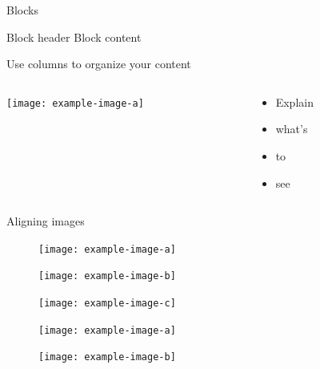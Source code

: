 \documentclass[ignorenonframetext,aspectratio=169]{beamer}
\begin{document}
\begin{frame}{Blocks}
\begin{block}{Block header}
Block content
\end{block}
\end{frame}

\begin{frame}{Use columns to organize your content}

\begin{columns}[T]
\begin{column}{0.55\textwidth}
\texttt{[image: example-image-a]}
\end{column}

\begin{column}{0.45\textwidth}
\begin{itemize}[<+->]
\item Explain
\item what's
\item to
\item see
\end{itemize}
\end{column}
\end{columns}

\end{frame}

\begin{frame}{Aligning images}

\begin{figure}
\begin{minipage}{0.3\textwidth}
\centering
\texttt{[image: example-image-a]}%
\end{minipage}%
\begin{minipage}{0.3\textwidth}
\centering
\texttt{[image: example-image-b]}%
\end{minipage}%
\begin{minipage}{0.3\textwidth}
\centering
\texttt{[image: example-image-c]}%
\end{minipage}%

\vspace{5ex}

\begin{minipage}{0.45\textwidth}
\centering
\texttt{[image: example-image-a]}%
\end{minipage}%
\begin{minipage}{0.45\textwidth}
\centering
\texttt{[image: example-image-b]}%
\end{minipage}%
\end{figure}

\end{frame}
\end{document}

